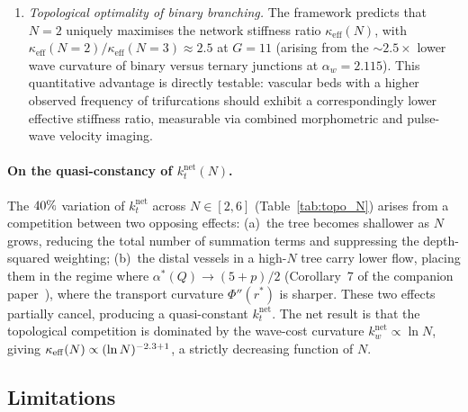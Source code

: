 \documentclass[11pt,a4paper]{article}
\theoremstyle{remark}
\begin{document}
\begin{enumerate}
\item \textit{Topological optimality of binary branching.}
The framework predicts that $N=2$ uniquely maximises the network
stiffness ratio $\kappa_{\mathrm{eff}}(N)$, with
$\kappa_{\mathrm{eff}}(N=2)/\kappa_{\mathrm{eff}}(N=3) \approx 2.5$
at $G=11$ (arising from the ${\sim}2.5\times$ lower wave curvature
of binary versus ternary junctions at $\alpha_w = 2.115$). This
quantitative advantage is directly testable: vascular beds with a
higher observed frequency of trifurcations should exhibit a
correspondingly lower effective stiffness ratio, measurable via
combined morphometric and pulse-wave velocity imaging.
\end{enumerate}


\paragraph{On the quasi-constancy of $k_t^\mathrm{net}(N)$.}
The $40\%$ variation of $k_t^\mathrm{net}$ across $N \in [2, 6]$
(Table~\ref{tab:topo_N}) arises from a competition between two opposing effects:
(a)~the tree becomes shallower as $N$ grows, reducing the total number of
summation terms and suppressing the depth-squared weighting; (b)~the distal
vessels in a high-$N$ tree carry lower flow, placing them in the regime where
$\alpha^*(Q) \to (5+p)/2$ (Corollary~7 of the companion
paper~\cite{Marchesi2026static}), where the transport curvature $\Phi''(r^*)$ is
sharper. These two effects partially cancel, producing a quasi-constant
$k_t^\mathrm{net}$. The net result is that the topological competition is
dominated by the wave-cost curvature $k_w^\mathrm{net} \propto \ln N$, giving
$\kappa_\mathrm{eff}(N) \propto (\ln N)^{-2.3 + 1}$, a strictly
decreasing function of $N$.

\subsection{Limitations}
\end{document}
